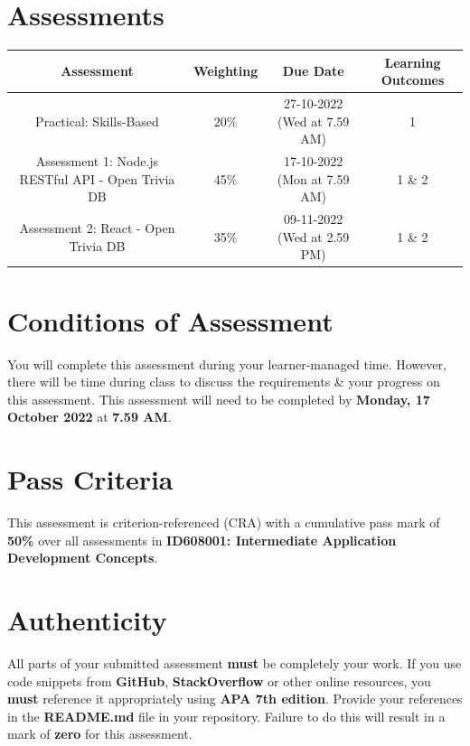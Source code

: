 \documentclass{article}
\begin{document}
\section*{Assessments}
\renewcommand{\arraystretch}{1.5}
\begin{tabular}{|c|c|c|c|}
	\hline
	\textbf{Assessment}                                 & \textbf{Weighting} & \textbf{Due Date}            & \textbf{Learning Outcomes} \\ \hline
	\small Practical: Skills-Based & \small 20\%        & \small 27-10-2022 (Wed at 7.59 AM)   & \small 1                   \\ \hline
	\small Assessment 1: Node.js RESTful API - Open Trivia DB              & \small 45\%        & \small 17-10-2022 (Mon at 7.59 AM)  & \small 1 \& 2                   \\ \hline
	\small Assessment 2: React - Open Trivia DB                        & \small 35\%        & \small 09-11-2022 (Wed at 2.59 PM)  & \small 1 \& 2                   \\ \hline
\end{tabular}

\section*{Conditions of Assessment}
You will complete this assessment during your learner-managed time. However, there will be time during class to discuss the requirements \& your progress on this assessment. This assessment will need to be completed by \textbf{Monday, 17 October 2022} at \textbf{7.59 AM}.

\section*{Pass Criteria}
This assessment is criterion-referenced (CRA) with a cumulative pass mark of \textbf{50\%} over all assessments in \textbf{ID608001: Intermediate Application Development Concepts}.

\section*{Authenticity}
All parts of your submitted assessment \textbf{must} be completely your work. If you use code snippets from \textbf{GitHub}, \textbf{StackOverflow} or other online resources, you \textbf{must} reference it appropriately using \textbf{APA 7th edition}. Provide your references in the \textbf{README.md} file in your repository. Failure to do this will result in a mark of \textbf{zero} for this assessment.
\end{document}
